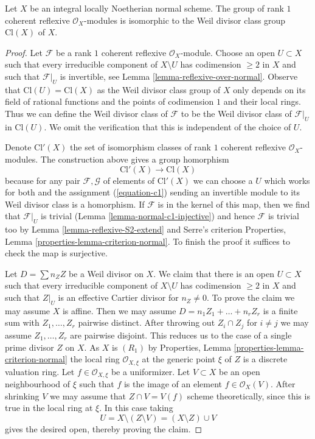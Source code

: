 \begin{lemma}
\label{lemma-normal-class-group}
Let $X$ be an integral locally Noetherian normal scheme.
The group of rank $1$ coherent reflexive $\mathcal{O}_X$-modules
is isomorphic to the Weil divisor class group $\text{Cl}(X)$ of $X$.
\end{lemma}

\begin{proof}
Let $\mathcal{F}$ be a rank $1$ coherent reflexive $\mathcal{O}_X$-module.
Choose an open $U \subset X$ such that
every irreducible component of $X \setminus U$ has codimension $\geq 2$
in $X$ and such that $\mathcal{F}|_U$ is invertible, see
Lemma \ref{lemma-reflexive-over-normal}.
Observe that $\text{Cl}(U) = \text{Cl}(X)$
as the Weil divisor class group of $X$ only depends on
its field of rational functions and the points of
codimension $1$ and their local rings.
Thus we can define the Weil divisor class of $\mathcal{F}$
to be the Weil divisor class of $\mathcal{F}|_U$
in $\text{Cl}(U)$. We omit the verification that this
is independent of the choice of $U$.

\medskip\noindent
Denote $\text{Cl}'(X)$ the set of isomorphism classes of
rank $1$ coherent reflexive $\mathcal{O}_X$-modules. The
construction above gives a group homorphism
$$
\text{Cl}'(X) \longrightarrow \text{Cl}(X)
$$
because for any pair $\mathcal{F}, \mathcal{G}$ of elements
of $\text{Cl}'(X)$ we can choose a $U$ which works for both
and the assignment (\ref{equation-c1}) sending an invertible
module to its Weil divisor class is a homorphism.
If $\mathcal{F}$ is in the kernel of this map, then we find that
$\mathcal{F}|_U$ is trivial (Lemma \ref{lemma-normal-c1-injective})
and hence $\mathcal{F}$ is trivial too by
Lemma \ref{lemma-reflexive-S2-extend} and Serre's criterion
Properties, Lemma \ref{properties-lemma-criterion-normal}.
To finish the proof it suffices to check the map is surjective.

\medskip\noindent
Let $D = \sum n_Z Z$ be a Weil divisor on $X$.
We claim that there is an open $U \subset X$ such that
every irreducible component of $X \setminus U$ has codimension $\geq 2$
in $X$ and such that $Z|_U$ is an effective Cartier divisor
for $n_Z \not = 0$. To prove the claim we may assume $X$ is affine.
Then we may assume $D = n_1 Z_1 + \ldots + n_r Z_r$ is a finite sum
with $Z_1, \ldots, Z_r$ pairwise distinct. After throwing out
$Z_i \cap Z_j$ for $i \not = j$ we may assume $Z_1, \ldots, Z_r$
are pairwise disjoint. This reduces us to the case of a single
prime divisor $Z$ on $X$. As $X$ is $(R_1)$ by
Properties, Lemma \ref{properties-lemma-criterion-normal}
the local ring
$\mathcal{O}_{X, \xi}$ at the generic point $\xi$ of $Z$ is a discrete
valuation ring. Let $f \in \mathcal{O}_{X, \xi}$ be a uniformizer.
Let $V \subset X$ be an open neighbourhood of $\xi$ such that
$f$ is the image of an element $f \in \mathcal{O}_X(V)$.
After shrinking $V$ we may assume that $Z \cap V = V(f)$
scheme theoretically, since this is true in the local ring
at $\xi$. In this case taking
$$
U = X \setminus (Z \setminus V) = (X \setminus Z) \cup V
$$
gives the desired open, thereby proving the claim.


\end{proof}
